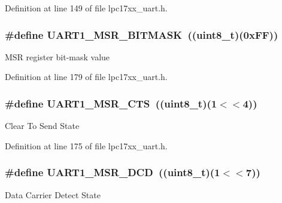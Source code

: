 \-Definition at line 149 of file lpc17xx\-\_\-uart.\-h.

\hypertarget{group___u_a_r_t___private___macros_gaa25ca1b2a81d8ee9d9aad9cafdd04668}{
\subsubsection[{\-U\-A\-R\-T1\-\_\-\-M\-S\-R\-\_\-\-B\-I\-T\-M\-A\-S\-K}]{\setlength{\rightskip}{0pt plus 5cm}\#define {\bf \-U\-A\-R\-T1\-\_\-\-M\-S\-R\-\_\-\-B\-I\-T\-M\-A\-S\-K}~((uint8\-\_\-t)(0x\-F\-F))}}\label{group___u_a_r_t___private___macros_gaa25ca1b2a81d8ee9d9aad9cafdd04668}
\-M\-S\-R register bit-\/mask value 

\-Definition at line 179 of file lpc17xx\-\_\-uart.\-h.

\hypertarget{group___u_a_r_t___private___macros_gae33cbb3bfc95dfa93e011c08057aa58c}{
\subsubsection[{\-U\-A\-R\-T1\-\_\-\-M\-S\-R\-\_\-\-C\-T\-S}]{\setlength{\rightskip}{0pt plus 5cm}\#define {\bf \-U\-A\-R\-T1\-\_\-\-M\-S\-R\-\_\-\-C\-T\-S}~((uint8\-\_\-t)(1$<$$<$4))}}\label{group___u_a_r_t___private___macros_gae33cbb3bfc95dfa93e011c08057aa58c}
\-Clear \-To \-Send \-State 

\-Definition at line 175 of file lpc17xx\-\_\-uart.\-h.

\hypertarget{group___u_a_r_t___private___macros_gad420620d318c71094a74ba44b1ce3483}{
\subsubsection[{\-U\-A\-R\-T1\-\_\-\-M\-S\-R\-\_\-\-D\-C\-D}]{\setlength{\rightskip}{0pt plus 5cm}\#define {\bf \-U\-A\-R\-T1\-\_\-\-M\-S\-R\-\_\-\-D\-C\-D}~((uint8\-\_\-t)(1$<$$<$7))}}\label{group___u_a_r_t___private___macros_gad420620d318c71094a74ba44b1ce3483}
\-Data \-Carrier \-Detect \-State 

